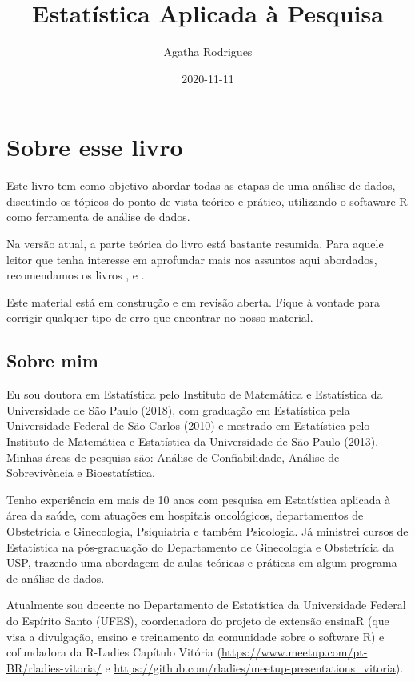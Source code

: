 \documentclass[
]{book}
\title{Estatística Aplicada à Pesquisa}
\author{Agatha Rodrigues}
\date{2020-11-11}
\begin{document}
\maketitle

{
\setcounter{tocdepth}{1}
\tableofcontents
}
\hypertarget{sobre-esse-livro}{%
\chapter{Sobre esse livro}\label{sobre-esse-livro}}

Este livro tem como objetivo abordar todas as etapas de uma análise de dados, discutindo os tópicos do ponto de vista teórico e prático, utilizando o softaware \href{https://cran.r-project.org/}{R} como ferramenta de análise de dados.

Na versão atual, a parte teórica do livro está bastante resumida. Para aquele leitor que tenha interesse em aprofundar mais nos assuntos aqui abordados, recomendamos os livros \citet{morettin2020introduccaoa}, \citet{bussab2004estatistica} e \citet{magalhaes2002noccoes}.

Este material está em construção e em revisão aberta. Fique à vontade para corrigir qualquer tipo de erro que encontrar no nosso material.

\hypertarget{sobre-mim}{%
\section{Sobre mim}\label{sobre-mim}}

Eu sou doutora em Estatística pelo Instituto de Matemática e Estatística da Universidade de São Paulo (2018), com graduação em Estatística pela Universidade Federal de São Carlos (2010) e mestrado em Estatística pelo Instituto de Matemática e Estatística da Universidade de São Paulo (2013). Minhas áreas de pesquisa são: Análise de Confiabilidade, Análise de Sobrevivência e Bioestatística.

Tenho experiência em mais de 10 anos com pesquisa em Estatística aplicada à área da saúde, com atuações em hospitais oncológicos, departamentos de Obstetrícia e Ginecologia, Psiquiatria e também Psicologia. Já ministrei cursos de Estatística na pós-graduação do Departamento de Ginecologia e Obstetrícia da USP, trazendo uma abordagem de aulas teóricas e práticas em algum programa de análise de dados.

Atualmente sou docente no Departamento de Estatística da Universidade Federal do Espírito Santo (UFES), coordenadora do projeto de extensão ensinaR (que visa a divulgação, ensino e treinamento da comunidade sobre o software R) e cofundadora da R-Ladies Capítulo Vitória (\url{https://www.meetup.com/pt-BR/rladies-vitoria/} e \url{https://github.com/rladies/meetup-presentations_vitoria}).
\end{document}
